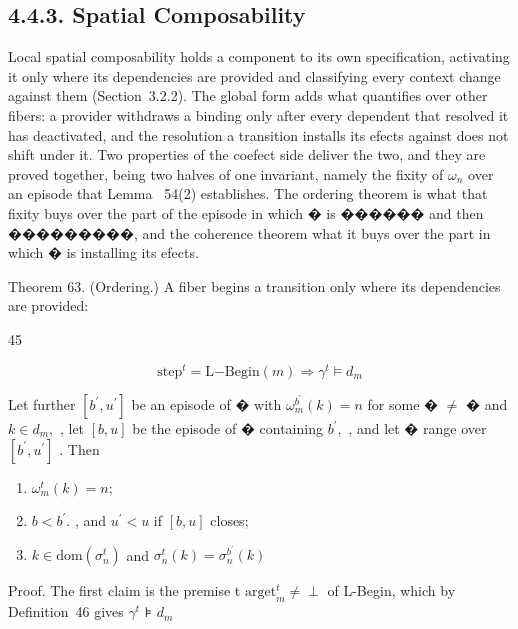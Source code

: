 \documentclass[
  10
]{article}
\begin{document}
\subsection{4.4.3. Spatial Composability}\label{spatial-composability}

Local spatial composability holds a component to its own specification,
activating it only where its dependencies are provided and classifying
every context change against them (Section~3.2.2). The global form adds
what quantifies over other fibers: a provider withdraws a binding only
after every dependent that resolved it has deactivated, and the
resolution a transition installs its efects against does not shift under
it. Two properties of the coefect side deliver the two, and they are
proved together, being two halves of one invariant, namely the fixity of
\(\omega _ { n }\) over an episode that Lemma~ 54(2) establishes. The
ordering theorem is what that fixity buys over the part of the episode
in which � is ������ and then ���������, and the coherence theorem what
it buys over the part in which � is installing its efects.

Theorem 63. (Ordering.) A fiber begins a transition only where its
dependencies are provided:

45

\[
{ \mathrm { s t e p } } ^ { t } = { \mathrm { L } } \mathrm { - B e g i n } ( m ) \Rightarrow \gamma ^ { t } \models d _ { m }\tag{58}
\]

Let further \([ b ^ { \prime } , u ^ { \prime } ]\) be an episode of �
with \(\omega _ { m } ^ { b ^ { \prime } } ( k ) = n\) for some �
\(\neq\) � and \(k \in d _ { m } ,\) , let \([ b , u ]\) be the episode
of � containing \(b ^ { \prime } ,\) , and let � range over
\([ b ^ { \prime } , u ^ { \prime } ]\) . Then

\begin{enumerate}
\def\labelenumi{\arabic{enumi}.}
\item
  \(\omega _ { m } ^ { t } ( k ) = n ;\)
\item
  \(b < b ^ { \prime } .\) , and \(u ^ { \prime } < u\) if \([ b , u ]\)
  closes;
\item
  \(k \in \mathrm { d o m } ( \sigma _ { n } ^ { t } )\) and
  \(\sigma _ { n } ^ { t } ( k ) = \sigma _ { n } ^ { b ^ { \prime } } ( k )\)
\end{enumerate}

Proof. The first claim is the premise t
\(\mathrm { a r g e t } _ { m } ^ { t } \neq \perp\) of L-Begin, which
by Definition~46 gives \(\gamma ^ { t }\) ⊧ \(d _ { m }\)
\end{document}
